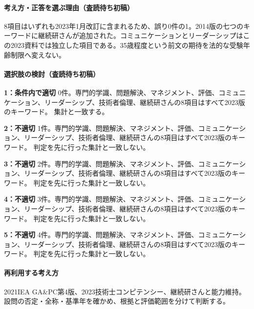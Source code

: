 \paragraph{考え方・正答を選ぶ理由（査読待ち初稿）} 8項目はいずれも2023年1月改訂に含まれるため、誤り0件の1。2014版の七つのキーワードに継続研さんが追加された。コミュニケーションとリーダーシップはこの2023資料では独立した項目である。35歳程度という前文の期待を法的な受験年齢制限へ変えない。

\paragraph{選択肢の検討（査読待ち初稿）}\mbox{}\par

\noindent\textbf{1：条件内で適切} 0件。専門的学識、問題解決、マネジメント、評価、コミュニケーション、リーダーシップ、技術者倫理、継続研さんの8項目はすべて2023版のキーワード。 集計と一致する。\par

\noindent\textbf{2：不適切} 1件。専門的学識、問題解決、マネジメント、評価、コミュニケーション、リーダーシップ、技術者倫理、継続研さんの8項目はすべて2023版のキーワード。 判定を先に行った集計と一致しない。\par

\noindent\textbf{3：不適切} 2件。専門的学識、問題解決、マネジメント、評価、コミュニケーション、リーダーシップ、技術者倫理、継続研さんの8項目はすべて2023版のキーワード。 判定を先に行った集計と一致しない。\par

\noindent\textbf{4：不適切} 3件。専門的学識、問題解決、マネジメント、評価、コミュニケーション、リーダーシップ、技術者倫理、継続研さんの8項目はすべて2023版のキーワード。 判定を先に行った集計と一致しない。\par

\noindent\textbf{5：不適切} 4件。専門的学識、問題解決、マネジメント、評価、コミュニケーション、リーダーシップ、技術者倫理、継続研さんの8項目はすべて2023版のキーワード。 判定を先に行った集計と一致しない。\par

\paragraph{再利用する考え方} 2021IEA GA\&PC第4版、2023技術士コンピテンシー、継続研さんと能力維持。 設問の否定・全称・基準年を確かめ、根拠と評価範囲を分けて判断する。

